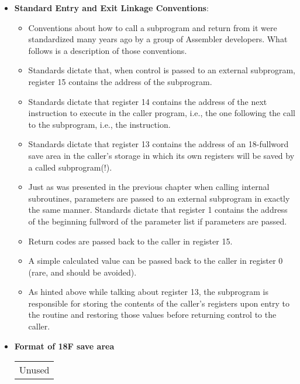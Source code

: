 \documentclass{report}
\begin{document}
\begin{itemize}
            \bigbreak \noindent 
        \item \textbf{Standard Entry and Exit Linkage Conventions}:
            \begin{itemize}
                \item Conventions about how to call a subprogram and return from it were standardized many years ago by a group of Assembler developers. What follows is a description of those conventions.
                \item Standards dictate that, when control is passed to an external subprogram, register 15 contains the address of the subprogram.
                \item Standards dictate that register 14 contains the address of the next instruction to execute in the caller program, i.e., the one following the call to the subprogram, i.e., the instruction.
                \item Standards dictate that register 13 contains the address of an 18-fullword save area in the caller's storage in which its own registers will be saved by a called subprogram(!).
                \item Just as was presented in the previous chapter when calling internal subroutines, parameters are passed to an external subprogram in exactly the same manner. Standards dictate that register 1 contains the address of the beginning fullword of the parameter list if parameters are passed.
                \item Return codes are passed back to the caller in register 15.
                \item A simple calculated value can be passed back to the caller in register 0 (rare, and should be avoided).
                \item As hinted above while talking about register 13, the subprogram is responsible for storing the contents of the caller's registers upon entry to the routine and restoring those values before returning control to the caller.
            \end{itemize}
        \item \textbf{Format of 18F save area}
            \bigbreak \noindent 
            \begin{center}
                \begin{tabular}{p{4cm}}
                    Unused \\

\end{tabular}
\end{center}
\end{itemize}
\end{document}
